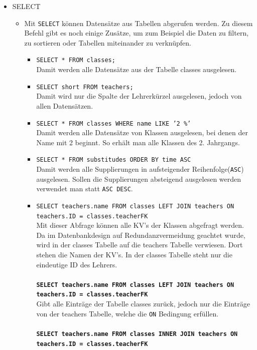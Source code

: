 \begin{itemize}
    \item SELECT
    	\begin{itemize}
	    	\item Mit \texttt{SELECT} können Datensätze aus Tabellen abgerufen werden. Zu diesem Befehl gibt es noch einige Zusätze, um zum Beispiel die Daten zu filtern, zu sortieren oder Tabellen miteinander zu verknüpfen.
	    	\begin{itemize}
		    	\item \texttt{SELECT * FROM classes;}\\
		    		Damit werden alle Datensätze aus der Tabelle classes ausgelesen.
		    	\item \texttt{SELECT short FROM teachers;}\\
			    	Damit wird nur die Spalte der Lehrerkürzel ausgelesen, jedoch von allen Datensätzen.
		    	\item \texttt{SELECT * FROM classes WHERE name LIKE '2 \%'}\\
		    		Damit werden alle Datensätze von Klassen ausgelesen, bei denen der Name mit 2 beginnt. So erhält man alle Klassen des 2. Jahrgangs.
		    	\item \texttt{SELECT * FROM substitudes ORDER BY time ASC}\\
		    		Damit werden alle Supplierungen in aufsteigender Reihenfolge(\texttt{ASC}) ausgelesen. Sollen die Supplierungen absteigend ausgelesen werden verwendet man statt \texttt{ASC DESC}.
		    	\item \texttt{SELECT teachers.name FROM classes LEFT JOIN teachers ON teachers.ID = classes.teacherFK}\\
		    		Mit dieser Abfrage können alle KV's der Klassen abgefragt werden. Da im Datenbankdesign auf Redundanzvermeidung geachtet wurde, wird in der classes Tabelle auf die teachers Tabelle verwiesen. Dort stehen die Namen der KV's. In der classes Tabelle steht nur die eindeutige ID des Lehrers.\\\\
		    		\textbf{\texttt{SELECT teachers.name FROM classes LEFT JOIN teachers ON teachers.ID = classes.teacherFK}}\\
		    			Gibt alle Einträge der Tabelle classes zurück, jedoch nur die Einträge von der teachers Tabelle, welche die \texttt{ON} Bedingung erfüllen.\\\\
		    		\textbf{\texttt{SELECT teachers.name FROM classes INNER JOIN teachers ON teachers.ID = classes.teacherFK}}\\

\end{itemize}
\end{itemize}
\end{itemize}
